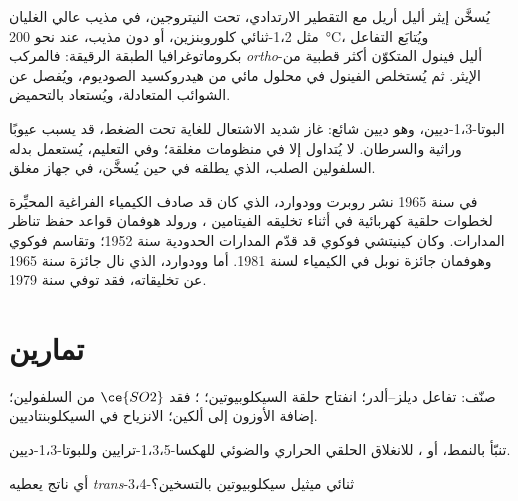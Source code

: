 \begin{inthelab}
يُسخَّن إيثر أليل أريل مع التقطير الارتدادي، تحت النيتروجين، في مذيب
عالي الغليان مثل 1،2-ثنائي كلوروبنزين، أو دون مذيب، عند نحو \qty{200}{\celsius}، 
ويُتابَع التفاعل بكروماتوغرافيا الطبقة الرقيقة: فالمركب \textit{ortho}-أليل فينول المتكوّن
أكثر قطبية من الإيثر. ثم يُستخلص الفينول في محلول مائي من هيدروكسيد
الصوديوم، ويُفصل عن الشوائب المتعادلة، ويُستعاد بالتحميض.
\end{inthelab}

\begin{safety}{}
البوتا-1،3-ديين، وهو ديين شائع: غاز شديد الاشتعال للغاية تحت الضغط، قد يسبب
عيوبًا وراثية والسرطان. لا يُتداول إلا في منظومات مغلقة؛ وفي التعليم،
يُستعمل بدله السلفولين الصلب، الذي يطلقه في  حين يُسخَّن،
في جهاز مغلق.
\end{safety}

\begin{history}
في سنة 1965 نشر روبرت وودوارد، الذي كان قد صادف الكيمياء الفراغية المحيِّرة
لخطوات حلقية كهربائية في أثناء تخليقه الفيتامين ، ورولد هوفمان
قواعد حفظ تناظر المدارات. وكان كينيتشي فوكوي قد قدّم
المدارات الحدودية سنة 1952؛ وتقاسم فوكوي وهوفمان جائزة نوبل في الكيمياء
لسنة 1981. أما وودوارد، الذي نال جائزة سنة 1965 عن تخليقاته، فقد توفي سنة
1979.
\end{history}

\section{تمارين}

\begin{exercise}[$\star$]\label{exo:b3:pericyclic:1}
صنّف: تفاعل ديلز--ألدر؛ انفتاح حلقة السيكلوبيوتين؛ ؛ فقد $\ce{SO2}$ من السلفولين؛ إضافة الأوزون إلى ألكين؛
الانزياح  في السيكلوبنتاديين.
\end{exercise}

\begin{exercise}[$\star$]\label{exo:b3:pericyclic:2}
تنبّأ بالنمط،  أو ، للانغلاق الحلقي الحراري 
والضوئي للهكسا-1،3،5-ترايين وللبوتا-1،3-ديين.
\end{exercise}

\begin{exercise}[$\star$]\label{exo:b3:pericyclic:3}
أي ناتج يعطيه \textit{trans}-3،4-ثنائي ميثيل سيكلوبيوتين بالتسخين؟
\end{exercise}


